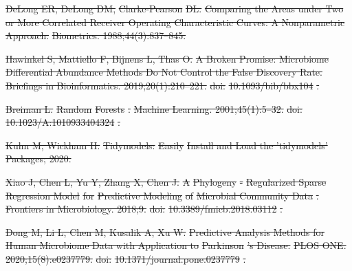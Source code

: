 \documentclass[10pt,letterpaper]{article}
\providecommand{\DIFdeltex}[1]{{\protect\color{red}\sout{#1}}}                      %
\providecommand{\DIFdel}[1]{\texorpdfstring{\DIFdeltex{#1}}{}} %
\begin{document}
\DIFdel{DeLong ER, DeLong DM, }%
\DIFdel{Clarke-Pearson}%
\DIFdel{DL.
}%
\DIFdel{Comparing the Areas under Two or More Correlated Receiver Operating
  Characteristic Curves: A Nonparametric Approach.
}%
\DIFdel{Biometrics. 1988;44(3):837--845.
}%

\DIFdel{Hawinkel S, Mattiello F, Bijnens L, Thas O.
}%
\DIFdel{A Broken Promise: Microbiome Differential Abundance Methods Do Not
  Control the False Discovery Rate.
}%
\DIFdel{Briefings in Bioinformatics. 2019;20(1):210--221.
}%
\DIFdel{doi:}%
\DIFdel{10.1093/bib/bbx104}%
\DIFdel{.
}%

\DIFdel{Breiman L.
}%
\DIFdel{Random }%
\DIFdel{Forests}%
\DIFdel{.
}%
\DIFdel{Machine Learning. 2001;45(1):5--32.
}%
\DIFdel{doi:}%
\DIFdel{10.1023/A:1010933404324}%
\DIFdel{.
}%

\DIFdel{Kuhn M, Wickham H.
}%
\DIFdel{Tidymodels: }%
\DIFdel{Easily}%
\DIFdel{Install and Load the 'tidymodels' Packages;
  2020.
}%

\DIFdel{Xiao J, Chen L, Yu Y, Zhang X, Chen J.
}%
\DIFdel{A }%
\DIFdel{Phylogeny}%
\DIFdel{-}%
\DIFdel{Regularized Sparse Regression Model}%
\DIFdel{for
  }%
\DIFdel{Predictive Modeling}%
\DIFdel{of }%
\DIFdel{Microbial Community Data}%
\DIFdel{.
}%
\DIFdel{Frontiers in Microbiology. 2018;9.
}%
\DIFdel{doi:}%
\DIFdel{10.3389/fmicb.2018.03112}%
\DIFdel{.
}%

\DIFdel{Dong M, Li L, Chen M, Kusalik A, Xu W.
}%
\DIFdel{Predictive Analysis Methods for Human Microbiome Data with
  Application to }%
\DIFdel{Parkinson}%
\DIFdel{'s Disease.
}%
\DIFdel{PLOS ONE. 2020;15(8):e0237779.
}%
\DIFdel{doi:}%
\DIFdel{10.1371/journal.pone.0237779}%
\DIFdel{.
}%
\end{document}
